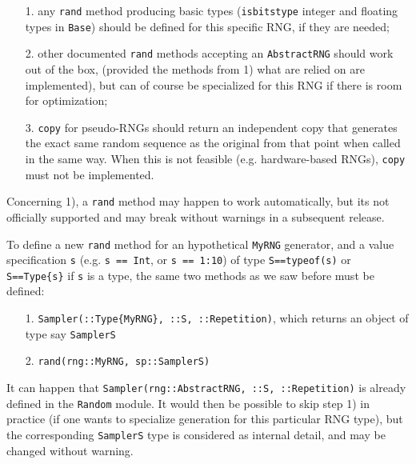 \begin{itemize}
\item[1. ] any \texttt{rand} method producing {\textquotedbl}basic{\textquotedbl} types (\texttt{isbitstype} integer and floating types in \texttt{Base}) should be defined for this specific RNG, if they are needed;


\item[2. ] other documented \texttt{rand} methods accepting an \texttt{AbstractRNG} should work out of the box, (provided the methods from 1) what are relied on are implemented), but can of course be specialized for this RNG if there is room for optimization;


\item[3. ] \texttt{copy} for pseudo-RNGs should return an independent copy that generates the exact same random sequence as the original from that point when called in the same way. When this is not feasible (e.g. hardware-based RNGs), \texttt{copy} must not be implemented.

\end{itemize}


Concerning 1), a \texttt{rand} method may happen to work automatically, but it{\textquotesingle}s not officially supported and may break without warnings in a subsequent release.



To define a new \texttt{rand} method for an hypothetical \texttt{MyRNG} generator, and a value specification \texttt{s} (e.g. \texttt{s == Int}, or \texttt{s == 1:10}) of type \texttt{S==typeof(s)} or \texttt{S==Type\{s\}} if \texttt{s} is a type, the same two methods as we saw before must be defined:



\begin{itemize}
\item[1. ] \texttt{Sampler(::Type\{MyRNG\}, ::S, ::Repetition)}, which returns an object of type say \texttt{SamplerS}


\item[2. ] \texttt{rand(rng::MyRNG, sp::SamplerS)}

\end{itemize}


It can happen that \texttt{Sampler(rng::AbstractRNG, ::S, ::Repetition)} is already defined in the \texttt{Random} module. It would then be possible to skip step 1) in practice (if one wants to specialize generation for this particular RNG type), but the corresponding \texttt{SamplerS} type is considered as internal detail, and may be changed without warning.



